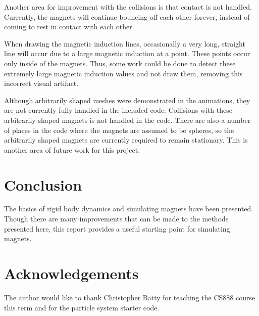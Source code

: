 \documentclass[tog]{acmsiggraph}
\begin{document}
Another area for improvement with the collisions is that contact is not handled. Currently, the magnets will continue bouncing off each other forever, instead of coming to rest in contact with each other.

When drawing the magnetic induction lines, occasionally a very long, straight line will occur due to a large magnetic induction at a point. These points occur only inside of the magnets. Thus, some work could be done to detect these extremely large magnetic induction values and not draw them, removing this incorrect visual artifact.

Although arbitrarily shaped meshes were demonstrated in the animations, they are not currently fully handled in the included code. Collisions with these arbitrarily shaped magnets is not handled in the code. There are also a number of places in the code where the magnets are assumed to be spheres, so the arbitrarily shaped magnets are currently required to remain stationary. This is another area of future work for this project.

\section{Conclusion}

The basics of rigid body dynamics and simulating magnets have been presented. Though there are many improvements that can be made to the methods presented here, this report provides a useful starting point for simulating magnets.

\section*{Acknowledgements}

The author would like to thank Christopher Batty for teaching the CS888 course this term and for the particle system starter code.




\end{document}
